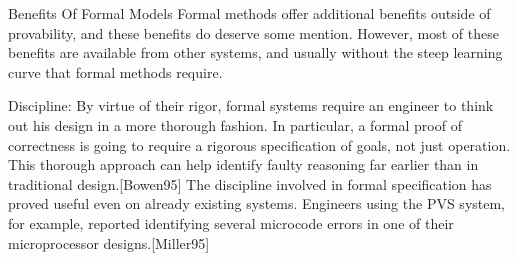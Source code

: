 Benefits Of Formal Models
Formal methods offer additional benefits outside of provability, and these benefits do deserve some mention. However, most of these benefits are available from other systems, and usually without the steep learning curve that formal methods require.

Discipline: By virtue of their rigor, formal systems require an engineer to think out his design in a more thorough fashion. In particular, a formal proof of correctness is going to require a rigorous specification of goals, not just operation. This thorough approach can help identify faulty reasoning far earlier than in traditional design.[Bowen95]
The discipline involved in formal specification has proved useful even on already existing systems. Engineers using the PVS system, for example, reported identifying several microcode errors in one of their microprocessor designs.[Miller95]

